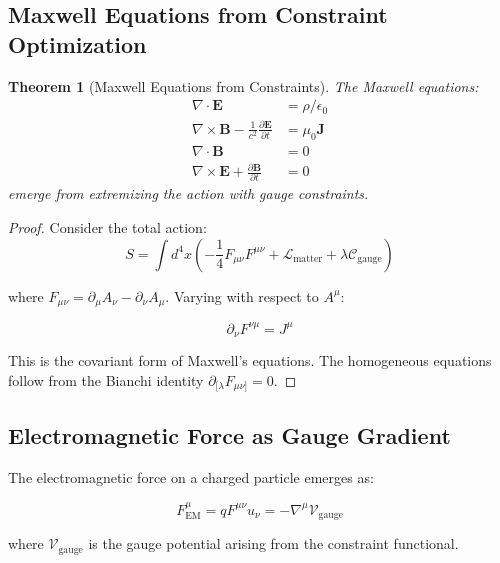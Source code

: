 \documentclass[11pt,a4paper]{article}
\newtheorem{theorem}{Theorem}
\begin{document}
\subsection{Maxwell Equations from Constraint Optimization}

\begin{theorem}[Maxwell Equations from Constraints]
The Maxwell equations:
\begin{align}
\nabla \cdot \mathbf{E} &= \rho/\epsilon_0 \\
\nabla \times \mathbf{B} - \frac{1}{c^2}\frac{\partial \mathbf{E}}{\partial t} &= \mu_0 \mathbf{J} \\
\nabla \cdot \mathbf{B} &= 0 \\
\nabla \times \mathbf{E} + \frac{\partial \mathbf{B}}{\partial t} &= 0
\end{align}
emerge from extremizing the action with gauge constraints.
\end{theorem}

\begin{proof}
Consider the total action:
\begin{equation}
S = \int d^4x \left( -\frac{1}{4} F_{\mu\nu}F^{\mu\nu} + \mathcal{L}_{\text{matter}} + \lambda \mathcal{C}_{\text{gauge}} \right)
\end{equation}

where $F_{\mu\nu} = \partial_{\mu}A_{\nu} - \partial_{\nu}A_{\mu}$. Varying with respect to $A^{\mu}$:

\begin{equation}
\partial_{\nu}F^{\nu\mu} = J^{\mu}
\end{equation}

This is the covariant form of Maxwell's equations. The homogeneous equations follow from the Bianchi identity $\partial_{[\lambda}F_{\mu\nu]} = 0$.
\end{proof}

\subsection{Electromagnetic Force as Gauge Gradient}

The electromagnetic force on a charged particle emerges as:

\begin{equation}
F_{\text{EM}}^{\mu} = q F^{\mu\nu} u_{\nu} = -\nabla^{\mu} \mathcal{V}_{\text{gauge}}
\end{equation}

where $\mathcal{V}_{\text{gauge}}$ is the gauge potential arising from the constraint functional.
\end{document}

